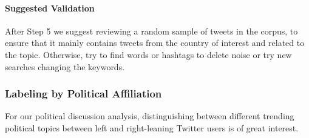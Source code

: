             \paragraph{Suggested Validation}
            After Step 5 we suggest reviewing a random sample of tweets in the corpus, to ensure that it mainly contains tweets from the country of interest and related to the topic. Otherwise, try to find words or hashtags to delete noise or try new searches changing the keywords.
            
            
            
            
            

            

        
            \subsubsection{Labeling by Political Affiliation }\label{subsec_meth_label}
            
            
            For our political discussion analysis, distinguishing between different trending political topics between left and right-leaning Twitter users is of great interest. %
            
